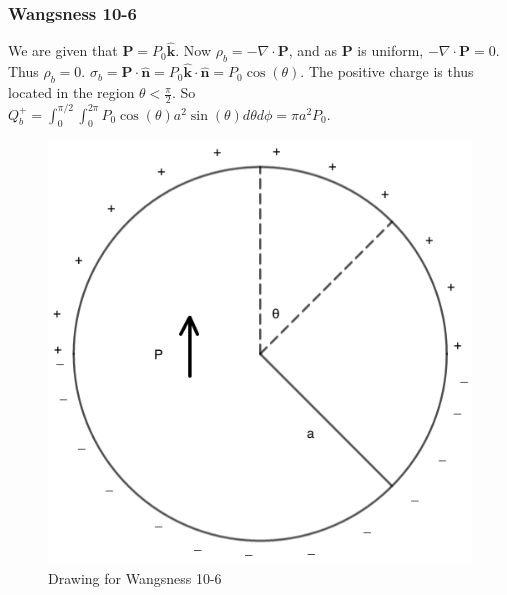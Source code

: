 \documentclass[crop=false,class=article,oneside]{standalone}
\begin{document}
        \subsubsection{Wangsness 10-6}
        We are given that $\mathbf{P} = P_0 \hat{\mathbf{k}}$. Now $\rho_{b} = -\nabla \cdot \mathbf{P}$, and as $\mathbf{P}$ is uniform, $-\nabla \cdot \mathbf{P} = 0$. Thus $\rho_b = 0$. $\sigma_b = \mathbf{P}\cdot \hat{\mathbf{n}} = P_0 \hat{\mathbf{k}} \cdot \hat{\mathbf{n}} = P_0 \cos(\theta)$. The positive charge is thus located in the region $\theta < \frac{\pi}{2}$. So $Q_b^+ = \int_{0}^{\pi/2}\int_{0}^{2\pi} P_0 \cos(\theta) a^2 \sin(\theta) d\theta d\phi = \pi a^2 P_0$.
        \begin{figure}[htbp]
            \centering
            \captionsetup{type=figure}
            \includegraphics[scale=0.3]{10-6.png}
            \caption{Drawing for Wangsness 10-6}
        \end{figure}
\end{document}
